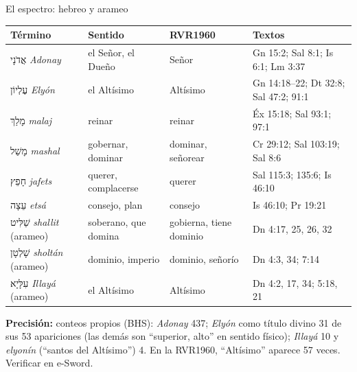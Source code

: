 \documentclass[hyperref={bookmarks=false},aspectratio=169]{beamer}
\newcommand{\heb}[1]{\mbox{\foreignlanguage{hebrew}{#1}}}
\newcommand{\precision}[1]{{\footnotesize\color{gris}\textbf{Precisión:} #1}}
\begin{document}
\begin{frame}{El espectro: hebreo y arameo}
\scriptsize\renewcommand{\arraystretch}{1.12}
\begin{tabular}{@{}>{\RaggedRight\arraybackslash}p{2.9cm}>{\RaggedRight\arraybackslash}p{3.0cm}>{\RaggedRight\arraybackslash}p{2.3cm}>{\RaggedRight\arraybackslash}p{3.5cm}@{}}
\toprule
\textbf{Término} & \textbf{Sentido} & \textbf{RVR1960} & \textbf{Textos} \\ \midrule
\heb{אֲדֹנָי} \emph{Adonay} & el Señor, el Dueño & Señor & Gn 15:2; Sal 8:1; Is 6:1; Lm 3:37 \\
\heb{עֶלְיוֹן} \emph{Elyón} & el Altísimo & Altísimo & Gn 14:18--22; Dt 32:8; Sal 47:2; 91:1 \\
\heb{מָלַךְ} \emph{malaj} & reinar & reinar & Éx 15:18; Sal 93:1; 97:1 \\
\heb{מָשַׁל} \emph{mashal} & gobernar, dominar & dominar, señorear & 1 Cr 29:12; Sal 103:19; Sal 8:6 \\
\heb{חָפֵץ} \emph{jafets} & querer, complacerse & querer & Sal 115:3; 135:6; Is 46:10 \\
\heb{עֵצָה} \emph{etsá} & consejo, plan & consejo & Is 46:10; Pr 19:21 \\ \midrule
\heb{שַׁלִּיט} \emph{shallit} (arameo) & soberano, que domina & gobierna, tiene dominio & Dn 4:17, 25, 26, 32 \\
\heb{שָׁלְטָן} \emph{sholtán} (arameo) & dominio, imperio & dominio, señorío & Dn 4:3, 34; 7:14 \\
\heb{עִלָּיָא} \emph{Illayá} (arameo) & el Altísimo & Altísimo & Dn 4:2, 17, 34; 5:18, 21 \\
\bottomrule
\end{tabular}\par\medskip
\precision{conteos propios (BHS): \emph{Adonay} 437; \emph{Elyón} como título divino 31 de sus 53 apariciones (las demás son ``superior, alto'' en sentido físico); \emph{Illayá} 10 y \emph{elyonín} (``santos del Altísimo'') 4. En la RVR1960, ``Altísimo'' aparece 57 veces. Verificar en e-Sword.}
\end{frame}
\end{document}
